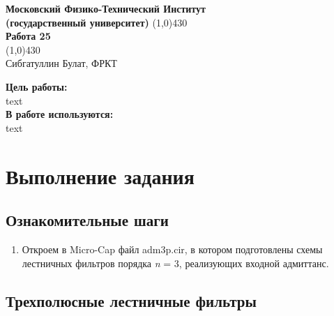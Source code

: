 \documentclass[a4paper, 12pt]{article}%
\begin{document}
\begin{titlepage}

\begin{center}
\large\textbf{Московский Физико-Технический Институт}\\
\large\textbf{(государственный университет)}
\vfill
\line(1,0){430}\\[1mm]
\huge\textbf{Работа 25}\\
\line(1,0){430}\\[1mm]
\vfill
\large Сибгатуллин Булат, ФРКТ\\
\end{center}

\end{titlepage}
\noindent \textbf{Цель работы:} \\
\indent text\\
\noindent \textbf{В работе используются:} \\
\indent text

\section{Выполнение задания}

\subsection{Ознакомительные шаги}

\begin{enumerate}

\item Откроем в Micro-Cap файл adm3p.cir, в котором подготовлены схемы лестничных фильтров порядка \textit{n} = 3, реализующих входной адмиттанс.

\end{enumerate}


\subsection{Трехполюсные лестничные фильтры}
\end{document}
